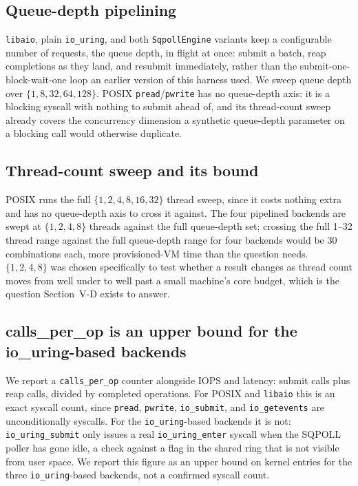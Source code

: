 \documentclass[conference]{IEEEtran}
\begin{document}
\subsection{Queue-depth pipelining}

\texttt{libaio}, plain \texttt{io\_uring}, and both \texttt{SqpollEngine} variants keep a
configurable number of requests, the queue depth, in flight at once: submit a batch, reap
completions as they land, and resubmit immediately, rather than the submit-one-block-wait-one
loop an earlier version of this harness used. We sweep queue depth over
$\{1, 8, 32, 64, 128\}$. POSIX \texttt{pread}/\texttt{pwrite} has no queue-depth axis: it is a
blocking syscall with nothing to submit ahead of, and its thread-count sweep already covers the
concurrency dimension a synthetic queue-depth parameter on a blocking call would otherwise
duplicate.

\subsection{Thread-count sweep and its bound}

POSIX runs the full $\{1, 2, 4, 8, 16, 32\}$ thread sweep, since it costs nothing extra and has
no queue-depth axis to cross it against. The four pipelined backends are swept at
$\{1, 2, 4, 8\}$ threads against the full queue-depth set; crossing the full 1--32 thread range
against the full queue-depth range for four backends would be 30 combinations each, more
provisioned-VM time than the question needs. $\{1, 2, 4, 8\}$ was chosen specifically to test
whether a result changes as thread count moves from well under to well past a small machine's
core budget, which is the question Section~V-D exists to answer.

\subsection{calls\_per\_op is an upper bound for the io\_uring-based backends}

We report a \texttt{calls\_per\_op} counter alongside IOPS and latency: submit calls plus reap
calls, divided by completed operations. For POSIX and \texttt{libaio} this is an exact syscall
count, since \texttt{pread}, \texttt{pwrite}, \texttt{io\_submit}, and \texttt{io\_getevents} are
unconditionally syscalls. For the \texttt{io\_uring}-based backends it is not:
\texttt{io\_uring\_submit} only issues a real \texttt{io\_uring\_enter} syscall when the SQPOLL
poller has gone idle, a check against a flag in the shared ring that is not visible from user
space. We report this figure as an upper bound on kernel entries for the three
\texttt{io\_uring}-based backends, not a confirmed syscall count.
\end{document}
